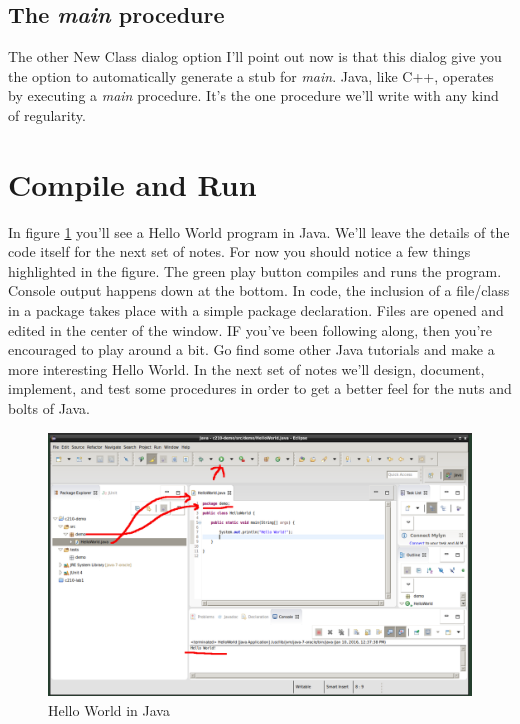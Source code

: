 \documentclass[]{tufte-handout}
\begin{document}
\subsection{The \textit{main} procedure}

The other New Class dialog option I'll point out now is that this dialog give you the option to automatically generate a stub for \textit{main}.  Java, like C++, operates by executing a \textit{main} procedure. It's the one procedure we'll write with any kind of regularity. 

\section{Compile and Run}

In figure \ref{fig:helloworld} you'll see a Hello World program in Java. We'll leave the details of the code itself for the next set of notes. For now you should notice a few things highlighted in the figure. The green play button compiles and runs the program. Console output happens down at the bottom. In code, the inclusion of a file/class in a package takes place with a simple package declaration. Files are opened and edited in the center of the window. IF you've been following along, then you're encouraged to play around a bit. Go find some other Java tutorials and make a more interesting Hello World. In the next set of notes we'll design, document, implement, and test some procedures in order to get a better feel for the nuts and bolts of Java. 


\vspace{.1in}
\begin{center}
\begin{figure}[h]
\includegraphics[scale=.25]{Eclipse-HelloWorld.png}
\caption{Hello World in Java}
\label{fig:helloworld} 
\end{figure}
\end{center}
\vspace{.1in}
\end{document}
